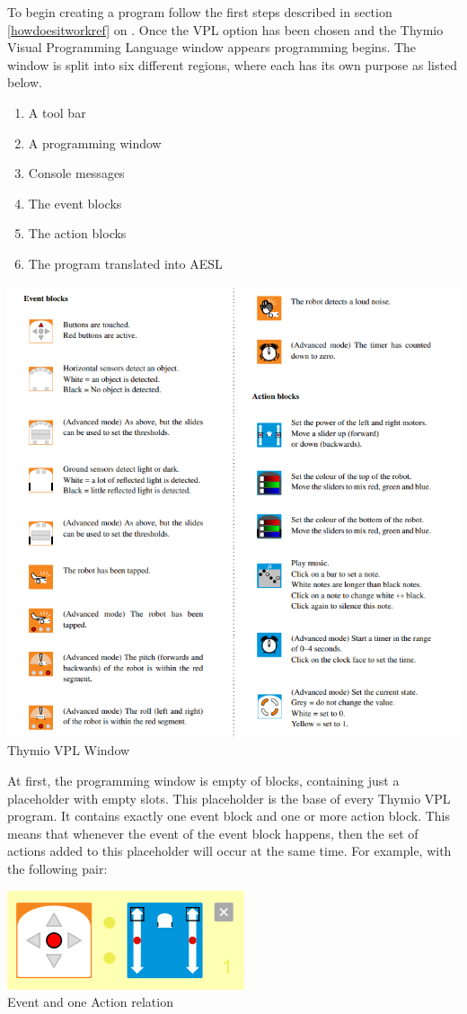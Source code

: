 \documentclass{scrreprt}
\begin{document}
To begin creating a program follow the first steps described in section \ref{howdoesitworkref} on \pageref{howdoesitworkref}. 
Once the VPL option has been chosen and the Thymio Visual Programming Language window appears programming begins. 
The window is split into six different regions, where each has its own purpose as listed below.
\begin{enumerate}
  \item A tool bar
  \item A programming window
  \item Console messages
  \item The event blocks
  \item The action blocks
  \item The program translated into AESL
\end{enumerate}

\begin{center}
  \includegraphics[width=\textwidth]{./VPL/Thymio_blocks}
  Thymio VPL Window
\end{center}

At first, the programming window is empty of blocks, containing just a placeholder with empty slots. 
This placeholder is the base of every Thymio VPL program. It contains exactly one event block and one or more action block. 
This means that whenever the event of the event block happens, then the set of actions added to this placeholder will occur at the same time. 
For example, with the following pair: \\
\begin{center}
  \includegraphics[scale=0.5]{./VPL/middlebtn_forward}\\
  Event and one Action relation
\end{center}
\end{document}

